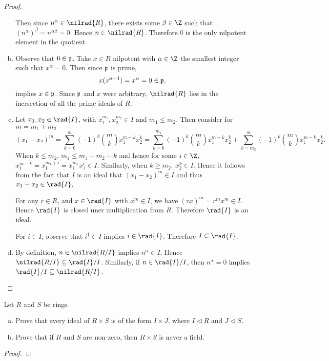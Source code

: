 \documentclass[10pt]{amsart}
\begin{document}
\begin{thm}
\begin{proof}
\begin{enumerate}[(a)]
      Then since $n^\alpha \in \nilrad{R}$, there exists some $\beta \in \Z$ such that $(n^\alpha)^\beta = n^{\alpha\beta} = 0$.
      Hence $n \in \nilrad{R}$.
      Therefore $\overline{0}$ is the only nilpotent element in the quotient.
    \item
      Observe that $0 \in \mathfrak{p}$.
      Take $x \in R$ nilpotent with $\alpha \in \Z$ the smallest integer such that $x^\alpha = 0$.
      Then since $\mathfrak{p}$ is prime,
      $$x(x^{\alpha - 1}) = x^\alpha = 0 \in \mathfrak{p},$$
      implies $x \in \mathfrak{p}$.
      Since $\mathfrak{p}$ and $x$ were arbitrary, $\nilrad{R}$ lies in the inersection of all the prime ideals of $R$.
    \item
      Let $x_1, x_2 \in \rad{I}$, with $x_1^{m_1}, x_2^{m_2} \in I$ and $m_1 \leq m_2$.
      Then consider for $m = m_1 + m_2$
      $$(x_1 - x_2)^m = \sum_{k=0}^m(-1)^k{m \choose k} x_1^{m-k}x_2^k = \sum_{k=0}^{m_2}(-1)^k{m \choose k} x_1^{m-k}x_2^k + \sum_{k=m_2}^m(-1)^k{m \choose k} x_1^{m-k}x_2^k.$$
      When $k \leq m_2$, $m_1 \leq m_1 + m_2 - k$ and hence for some $i \in \Z$, $x_1^{m-k} = x_1^{m_1 + i} = x_1^{m_1}x_1^i \in I$.
      Similarly, when $k \geq m_2$, $x_2^k \in I$.
      Hence it follows from the fact that $I$ is an ideal that $(x_1 - x_2)^m \in I$ and thus $x_1 - x_2 \in \rad{I}$.
      
      For any $r \in R$, and $x \in \rad{I}$ with $x^m \in I$, we have $(rx)^m = r^mx^m \in I$.
      Hence $\rad{I}$ is closed uner multiplication from $R$.
      Therefore $\rad{I}$ is an ideal.
      
      For $i \in I$, observe that $i^{1} \in I$ implies $i \in \rad{I}$.
      Therefore $I \subseteq \rad{I}$.
    \item
      By definition, $n \in \nilrad{R/I}$ implies $n^\alpha \in I$.
      Hence $\nilrad{R/I} \subseteq \rad{I}/I$.
      Similarly, if $n \in \rad{I}/I$, then $n^\alpha = 0$ implies $\rad{I}/I \subseteq \nilrad{R/I}$.
    \end{enumerate}
  \end{proof}
\end{thm}

\begin{thm}
  Let $R$ and $S$ be rings.
  \begin{enumerate}[(a)]
  \item
    Prove that every ideal of $R \times S$ is of the form $I \times J$, where $I \lhd R$ and $J \lhd S$.
  \item
    Prove that if $R$ and $S$ are non-zero, then $R \times S$ is never a field.
  \end{enumerate}
  \begin{proof}
  \end{proof}
\end{thm}
\end{document}
